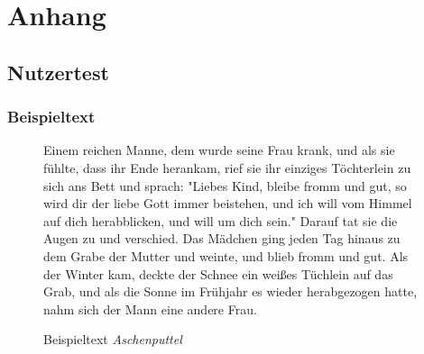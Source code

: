 
\chapter{Anhang}

\section*{Nutzertest}
\label{sec:anhang-test}

\subsection*{Beispieltext}
\begin{figure}[h!]
	Einem reichen Manne, dem wurde seine Frau krank, und als sie fühlte, dass ihr Ende herankam, rief sie ihr einziges Töchterlein zu sich ans Bett und sprach: "Liebes Kind, bleibe fromm und gut, so wird dir der liebe Gott immer beistehen, und ich will vom Himmel auf dich herabblicken, und will um dich sein." Darauf tat sie die Augen zu und verschied. Das Mädchen ging jeden Tag hinaus zu dem Grabe der Mutter und weinte, und blieb fromm und gut. Als der Winter kam, deckte der Schnee ein weißes Tüchlein auf das Grab, und als die Sonne im Frühjahr es wieder herabgezogen hatte, nahm sich der Mann eine andere Frau.
	\caption{Beispieltext \textit{Aschenputtel}}
\end{figure}


